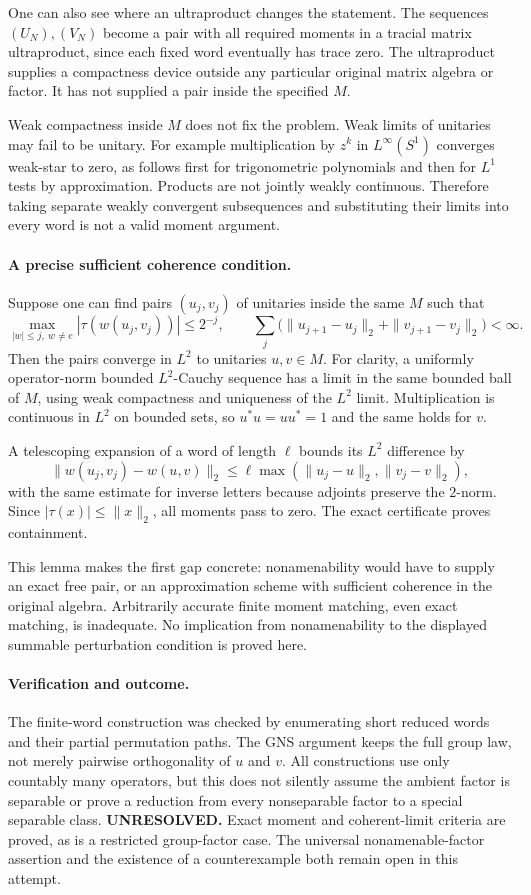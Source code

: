 \documentclass[11pt]{article}
\begin{document}
One can also see where an ultraproduct changes the
statement. The sequences $(U_N),(V_N)$ become a pair
with all required moments in a tracial matrix
ultraproduct, since each fixed word eventually has
trace zero. The ultraproduct supplies a compactness
device outside any particular original matrix
algebra or factor. It has not supplied a pair
inside the specified $M$.

Weak compactness inside $M$ does not fix the problem.
Weak limits of unitaries may fail to be unitary.
For example multiplication by $z^k$ in
$L^\infty(S^1)$ converges weak-star to zero, as
follows first for trigonometric polynomials and
then for $L^1$ tests by approximation. Products
are not jointly weakly continuous. Therefore
taking separate weakly convergent subsequences
and substituting their limits into every word
is not a valid moment argument.

\paragraph{A precise sufficient coherence condition.}
Suppose one can find pairs $(u_j,v_j)$ of unitaries
inside the same $M$ such that
\[
 \max_{|w|\leq j,\ w\ne e}|\tau(w(u_j,v_j))|\leq2^{-j},
 \qquad
 \sum_j\bigl(\|u_{j+1}-u_j\|_2+
                   \|v_{j+1}-v_j\|_2\bigr)<\infty.
\]
Then the pairs converge in $L^2$ to unitaries $u,v\in M$.
For clarity, a uniformly operator-norm bounded
$L^2$-Cauchy sequence has a limit in the same bounded
ball of $M$, using weak compactness and uniqueness
of the $L^2$ limit. Multiplication is continuous
in $L^2$ on bounded sets, so $u^*u=uu^*=1$ and
the same holds for $v$.

A telescoping expansion of a word of length $\ell$
bounds its $L^2$ difference by
\[
 \|w(u_j,v_j)-w(u,v)\|_2
 \leq\ell\max(\|u_j-u\|_2,\|v_j-v\|_2),
\]
with the same estimate for inverse letters because
adjoints preserve the $2$-norm. Since
$|\tau(x)|\leq\|x\|_2$, all moments pass to zero.
The exact certificate proves containment.

This lemma makes the first gap concrete: nonamenability
would have to supply an exact free pair, or an
approximation scheme with sufficient coherence in
the original algebra. Arbitrarily accurate finite
moment matching, even exact matching, is inadequate.
No implication from nonamenability to the displayed
summable perturbation condition is proved here.

\paragraph{Verification and outcome.}
The finite-word construction was checked by enumerating
short reduced words and their partial permutation paths.
The GNS argument keeps the full group law, not merely
pairwise orthogonality of $u$ and $v$. All constructions
use only countably many operators, but this does not
silently assume the ambient factor is separable or prove
a reduction from every nonseparable factor to a special
separable class.
\textbf{UNRESOLVED.} Exact moment and coherent-limit
criteria are proved, as is a restricted group-factor
case. The universal nonamenable-factor assertion and
the existence of a counterexample both remain open
in this attempt.
\end{document}

